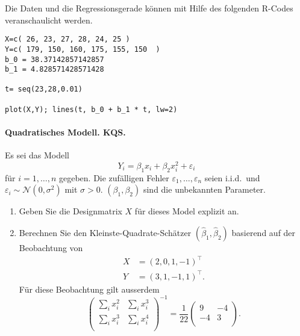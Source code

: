 Die Daten und die Regressionsgerade können mit Hilfe des folgenden R-Codes veranschaulicht werden. 
\begin{lstlisting}
X=c( 26, 23, 27, 28, 24, 25 )
Y=c( 179, 150, 160, 175, 155, 150  )
b_0 = 38.37142857142857
b_1 = 4.828571428571428

t= seq(23,28,0.01)

plot(X,Y); lines(t, b_0 + b_1 * t, lw=2)
\end{lstlisting}






\paragraph{Quadratisches Modell. KQS.} Es sei das Modell 
\begin{equation*}
    Y_i = \beta_1 x_i + \beta_2 x_{i}^2 + \varepsilon_i
\end{equation*}
für $i=1,\ldots,n$ gegeben. Die zufälligen Fehler $\varepsilon_1,\ldots,\varepsilon_n$ 
seien i.i.d.\ und $\varepsilon_i\sim \mathcal N(0,\sigma^2)$ mit $\sigma>0$. 
$\left(\beta_1, \beta_2 \right)$ sind die unbekannten Parameter. 
\begin{enumerate}
    \item Geben Sie die Designmatrix $X$ für dieses Model explizit an.
    \item Berechnen Sie den Kleinste-Quadrate-Schätzer $\left( \hat\beta_1,
        \hat\beta_2 \right)$ basierend auf der Beobachtung von
        \begin{align*}
            X &= \left( 2,0,1,-1 \right)^\top \\
            Y &= \left( 3,1,-1,1 \right)^\top.
        \end{align*}
        Für diese Beobachtung gilt ausserdem
        \begin{equation*}
            \left( 
                \begin{matrix}
                    \sum_{i}^{}x_i^2 & \sum_{i}^{} x_i^{3} \\
                    \sum_{i}^{} x_i^3 & \sum_{i}^{} x_i^4 \\
                \end{matrix}
            \right)^{-1} = 
            \frac{1}{22} \left( 
            \begin{matrix}
                9 & -4 \\
                -4 & 3 \\
            \end{matrix}
            \right).
        \end{equation*}
\end{enumerate}

